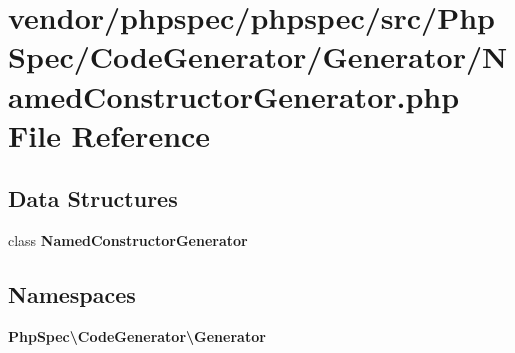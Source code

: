 \section{vendor/phpspec/phpspec/src/\+Php\+Spec/\+Code\+Generator/\+Generator/\+Named\+Constructor\+Generator.php File Reference}
\label{_named_constructor_generator_8php}
\subsection*{Data Structures}
\begin{DoxyCompactItemize}
\item 
class {\bf Named\+Constructor\+Generator}
\end{DoxyCompactItemize}
\subsection*{Namespaces}
\begin{DoxyCompactItemize}
\item 
 {\bf Php\+Spec\textbackslash{}\+Code\+Generator\textbackslash{}\+Generator}
\end{DoxyCompactItemize}
